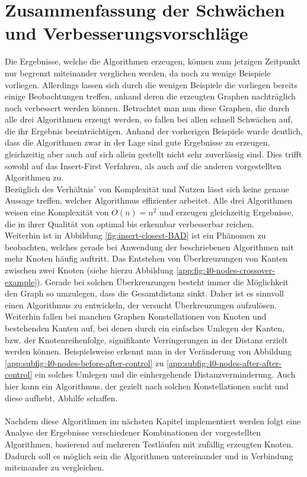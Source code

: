 \section{Zusammenfassung der Schwächen und Verbesserungsvorschläge}\label{sec:allBet}
Die Ergebnisse, welche die Algorithmen erzeugen, können zum jetzigen Zeitpunkt nur begrenzt miteinander verglichen werden, da noch zu wenige Beispiele vorliegen.
Allerdings lassen sich durch die wenigen Beispiele die vorliegen bereits einige Beobachtungen treffen, anhand deren die erzeugten Graphen nachträglich noch verbessert werden können.
Betrachtet man nun diese Graphen, die durch alle drei Algorithmen erzeugt werden, so fallen bei allen schnell Schwächen auf, die ihr Ergebnis beeinträchtigen.
Anhand der vorherigen Beispiele wurde deutlich, dass die Algorithmen zwar in der Lage sind gute Ergebnisse zu erzeugen, gleichzeitig aber auch auf sich allein gestellt nicht sehr zuverlässig sind.
Dies trifft sowohl auf das Insert-First Verfahren, als auch auf die anderen vorgestellten Algorithmen zu.
\\
Bezüglich des Verhältnis' von Komplexität und Nutzen lässt sich keine genaue Aussage treffen, welcher Algorithmus effizienter arbeitet.
Alle drei Algorithmen weisen eine Komplexität von $O(n) = n^2$ und erzeugen gleichzeitig Ergebnisse, die in ihrer Qualität von optimal bis erkennbar verbesserbar reichen. 
\\
Weiterhin ist in Abbildung \vref{fig:insert-closest-BAD} ist ein Phänomen zu beobachten, welches gerade bei Anwendung der beschriebenen Algorithmen mit mehr Knoten häufig auftritt.
Das Entstehen von Überkreuzungen von Kanten zwischen zwei Knoten (siehe hierzu Abbildung \vref{app:fig:40-nodes-crossover-example}).
Gerade bei solchen Überkreuzungen besteht immer die Möglichkeit den Graph so umzulegen, dass die Gesamtdistanz sinkt.
Daher ist es sinnvoll einen Algorithmus zu entwickeln, der versucht Überkreuzungen aufzulösen.
\\
Weiterhin fallen bei manchen Graphen Konstellationen von Knoten und bestehenden Kanten auf, bei denen durch ein einfaches Umlegen der Kanten, bzw. der Knotenreihenfolge, signifikante Verringerungen in der Distanz erzielt werden können.
Beispielsweise erkennt man in der Veränderung von Abbildung \vref{app:subfig:40-nodes-before-after-control} zu \vref{app:subfig:40-nodes-after-after-control} ein solches Umlegen und die einhergehende Distanzverminderung.
Auch hier kann ein Algorithmus, der gezielt nach solchen Konstellationen sucht und diese aufhebt, Abhilfe schaffen.
\\\\
Nachdem diese Algorithmen im nächsten Kapitel implementiert werden folgt eine Analyse der Ergebnisse verschiedener Kombinationen der vorgestellten Algorithmen, basierend auf mehreren Testläufen mit zufällig erzeugten Knoten.
Dadurch soll es möglich sein die Algorithmen untereinander und in Verbindung miteinander zu vergleichen.
